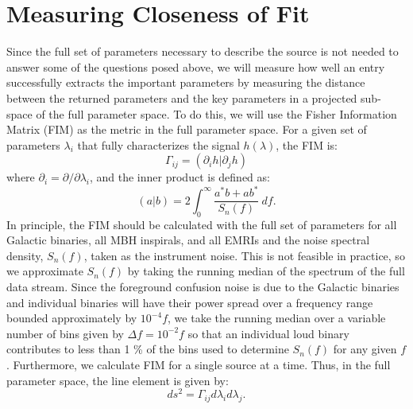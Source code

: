 \documentclass[11pt]{article}
\begin{document}
\section{Measuring Closeness of Fit}
Since the full set of parameters necessary to describe the source is not needed to answer some of the questions posed above, we will measure how well an entry successfully extracts the important parameters by measuring the distance between the returned parameters and the key parameters in a projected sub-space of the full parameter space. To do this, we will use the Fisher Information Matrix (FIM) as the metric in the full parameter space. For a given set of parameters $\lambda_i$ that fully characterizes the signal $h(\lambda)$, the FIM is:
\begin{equation}
\Gamma_{ij} = \left(\partial_ih|\partial_jh\right)
\end{equation}
where $\partial_i = \partial/\partial\lambda_i$, and the inner product is defined as:
\begin{equation}
\left(a|b\right) = 2\int_0^{\infty}{\frac{a^*b + ab^*}{S_n(f)}~df}.
\end{equation}
In principle, the FIM should be calculated with the full set of parameters for all Galactic binaries, all MBH inspirals, and all EMRIs and the noise spectral density, $S_n(f)$, taken as the instrument noise. This is not feasible in practice, so we approximate $S_n(f)$ by taking the running median of the spectrum of the full data stream. Since the foreground confusion noise is due to the Galactic binaries and individual binaries will have their power spread over a frequency range bounded approximately by $10^{-4} f$, we take the running median over a variable number of bins given by $\Delta f = 10^{-2} f$ so that an individual loud binary contributes to less than 1 \% of the bins used to determine $S_n(f)$ for any given $f$. Furthermore, we calculate FIM for a single source at a time. Thus, in the full parameter space, the line element is given by:
\begin{equation}
ds^2 = \Gamma_{ij}d\lambda_id\lambda_j.
\end{equation}
\end{document}
